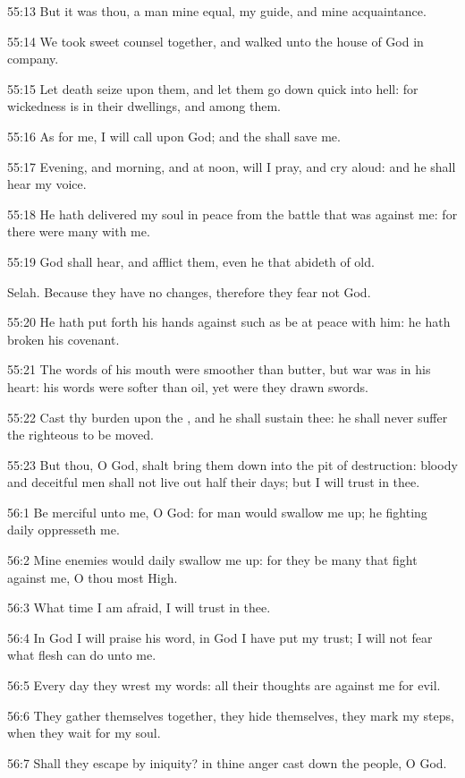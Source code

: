 55:13 But it was thou, a man mine equal, my guide, and mine acquaintance.

55:14 We took sweet counsel together, and walked unto the house of God in company.

55:15 Let death seize upon them, and let them go down quick into hell: for wickedness is in their dwellings, and among them.

55:16 As for me, I will call upon God; and the \LORD shall save me.

55:17 Evening, and morning, and at noon, will I pray, and cry aloud: and he shall hear my voice.

55:18 He hath delivered my soul in peace from the battle that was against me: for there were many with me.

55:19 God shall hear, and afflict them, even he that abideth of old.

Selah. Because they have no changes, therefore they fear not God.

55:20 He hath put forth his hands against such as be at peace with him: he hath broken his covenant.

55:21 The words of his mouth were smoother than butter, but war was in his heart: his words were softer than oil, yet were they drawn swords.

55:22 Cast thy burden upon the \LORD, and he shall sustain thee: he shall never suffer the righteous to be moved.

55:23 But thou, O God, shalt bring them down into the pit of destruction: bloody and deceitful men shall not live out half their days; but I will trust in thee.



56:1 Be merciful unto me, O God: for man would swallow me up; he fighting daily oppresseth me.

56:2 Mine enemies would daily swallow me up: for they be many that fight against me, O thou most High.

56:3 What time I am afraid, I will trust in thee.

56:4 In God I will praise his word, in God I have put my trust; I will not fear what flesh can do unto me.

56:5 Every day they wrest my words: all their thoughts are against me for evil.

56:6 They gather themselves together, they hide themselves, they mark my steps, when they wait for my soul.

56:7 Shall they escape by iniquity? in thine anger cast down the people, O God.

